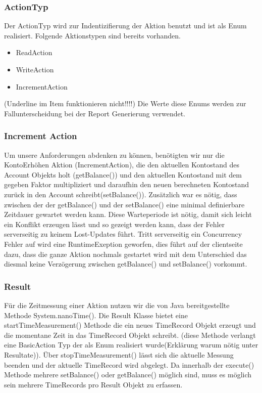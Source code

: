 \subsubsection{ActionTyp}
\label{sec:actionTyp}
Der ActionTyp wird zur Indentizifierung der Aktion benutzt und ist als Enum realisiert. Folgende Aktionstypen sind bereits vorhanden.

\begin{itemize}
\item ReadAction
\item WriteAction
\item IncrementAction
\end{itemize}
(Underline im Item funktionieren nicht!!!!)
Die Werte diese Enums werden zur Fallunterscheidung bei der Report Generierung verwendet.

 
\subsubsection{Increment Action}
\label{sec:incrementAction}
Um unsere Anforderungen abdenken zu können, benötigten wir nur die KontoErhöhen Aktion (IncrementAction), die den aktuellen Kontostand des Account Objekts holt (getBalance()) und den aktuellen Kontostand mit dem gegeben Faktor multipliziert und daraufhin den neuen berechneten Kontostand zurück in den Account schreibt(setBalance()). Zusätzlich war es nötig, dass zwischen der der getBalance() und der setBalance() eine minimal definierbare Zeitdauer gewartet werden kann. Diese Warteperiode ist nötig, damit sich leicht ein Konflikt erzeugen lässt und so gezeigt werden kann, dass der Fehler serverseitig zu keinem Lost-Updates führt. Tritt serverseitig ein Concurrency Fehler auf wird eine RuntimeExeption geworfen, dies führt auf der clientseite dazu, dass die ganze Aktion nochmals gestartet wird mit dem Unterschied das diesmal keine Verzögerung zwischen getBalance() und setBalance() vorkommt.

\subsubsection{Result}
\label{sec:result}
Für die Zeitmessung einer Aktion nutzen wir die von Java bereitgestellte Methode System.nanoTime(). Die Result Klasse bietet eine startTimeMeasurement() Methode die ein neues TimeRecord Objekt erzeugt und die momentane Zeit in das TimeRecord Objekt schreibt. (diese Methode verlangt eine BasicAction Typ der als Enum realisiert wurde(Erklärung warum nötig unter Resultate)). Über stopTimeMeasurement() lässt sich die aktuelle Messung beenden und der aktuelle TimeRecord wird abgelegt. Da innerhalb der execute() Methode mehrere setBalance() oder getBalance() möglich sind, muss es möglich sein mehrere TimeRecords pro Result Objekt zu erfassen.

